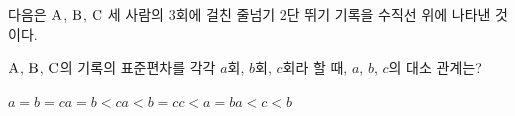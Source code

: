 다음은 $\mathrm{A}$, $\mathrm{B}$, $\mathrm{C}$ 세 사람의 $3$회에 걸친 줄넘기 $2$단 뛰기 기록을 수직선 위에 나타낸 것이다.\par\smallskip{\centering\par}\smallskip\noindent $\mathrm{A}$, $\mathrm{B}$, $\mathrm{C}$의 기록의 표준편차를 각각 $a$회, $b$회, $c$회라 할 때, $a$, $b$, $c$의 대소 관계는?
\begin{choices32}{$a=b=c$}{$a=b<c$}{$a<b=c$}{$c<a=b$}{$a<c<b$}\end{choices32}
